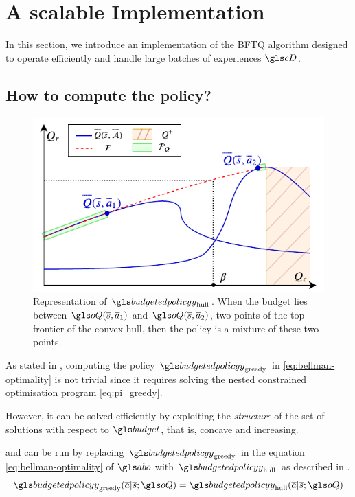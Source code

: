 


\section{A scalable Implementation}
\label{sec:scalable-bftq}
In this section, we introduce an implementation of the \gls{BFTQ} algorithm designed to operate efficiently and handle large batches of experiences $\cD$.

\subsection{How to compute the  policy?}

\begin{figure}
    \centering
    \includegraphics[width=0.75\linewidth]{sources/contribution/nips/source/img/pi.pdf}
    \caption[Representation of $\budgetedpolicy_\text{hull}$.]{Representation of $\budgetedpolicy_\text{hull}$. When the budget lies between $\oQ(\os,\oa_1)$ and $\oQ(\os,\oa_2)$, two points of the top frontier of the convex hull, then the policy is a mixture of these two points.}
    \label{fig:hull}
\end{figure}

\label{subsec:compute-greedy-policy}
As stated in , computing the  policy $\budgetedpolicy_\text{greedy}$ in \eqref{eq:bellman-optimality} is not trivial since it requires solving the nested constrained optimisation program \eqref{eq:pi_greedy}.

However, it can be solved efficiently by exploiting the \emph{structure} of the set of solutions with respect to $\budget$, that is, concave and increasing.

\begin{proposition}
    \label{prop:bftq_pi_hull}
     and  can be run by replacing $\budgetedpolicy_\text{greedy}$ in the equation \eqref{eq:bellman-optimality} of $\abo$ with $\budgetedpolicy_\text{hull}$ as described in .
    \begin{equation*}
        \budgetedpolicy_\text{greedy}(\oa|\os; \oQ) = \budgetedpolicy_\text{hull}(\oa|\os; \oQ)
    \end{equation*}
\end{proposition}

